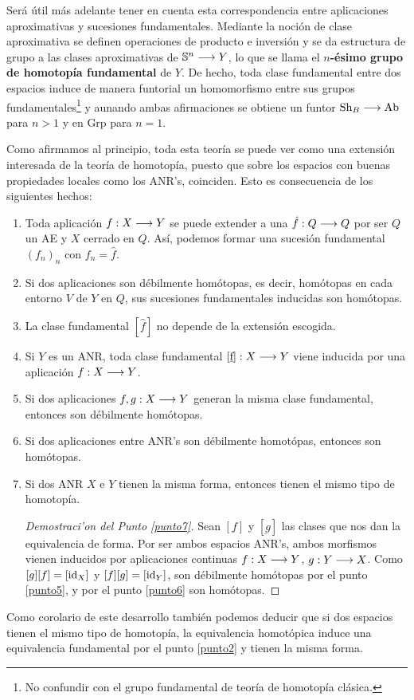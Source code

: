Será útil más adelante tener en cuenta esta correspondencia entre aplicaciones aproximativas y sucesiones fundamentales. Mediante la noción de clase aproximativa se definen operaciones de producto e inversión y se da estructura de grupo a las clases aproximativas de $ \mathbb{S}^n\longrightarrow Y  $, lo que se llama el $ n $\textbf{-ésimo grupo de homotopía fundamental} de $ Y  $. De hecho, toda clase fundamental entre dos espacios induce de manera funtorial un homomorfismo entre sus grupos fundamentales\footnote{No confundir con el grupo fundamental de teoría de homotopía clásica.} y aunando ambas afirmaciones se obtiene un funtor $ \operatorname{Sh}_B \longrightarrow \text{Ab} $ para $ n>1  $ y en Grp para $ n=1 $.

Como afirmamos al principio, toda esta teoría se puede ver como una extensión interesada de la teoría de homotopía, puesto que sobre los espacios con buenas propiedades locales como los ANR's, coinciden. Esto es consecuencia de los siguientes hechos:
\begin{enumerate}
  \item Toda aplicación $ f:X\longrightarrow Y  $ se puede extender a una $ \hat{f}:Q\longrightarrow Q  $ por ser $ Q  $ un AE y $ X  $ cerrado en $ Q  $. Así, podemos formar una sucesión fundamental $ (f_n )_n  $ con $ f_n =  \hat{f} $.
  \item  \label{punto2} Si dos aplicaciones son débilmente homótopas, es decir, homótopas en cada entorno $ V  $ de $ Y  $ en $ Q  $, sus sucesiones fundamentales inducidas son homótopas. 
  \item La clase fundamental $ [\hat{f}] $ no depende de la extensión escogida.
  \item Si $ Y  $ es un ANR, toda clase fundamental $ [\underbar{f}]:X\longrightarrow Y  $ viene inducida por una aplicación $ f:X\longrightarrow Y  $.
  \item Si dos aplicaciones $ f,g:X\longrightarrow Y  $ generan la misma clase fundamental, entonces son débilmente homótopas.\label{punto5}
  \item Si dos aplicaciones entre ANR's son débilmente homotópas, entonces son homótopas. \label{punto6}
  \item Si dos ANR $ X  $ e $ Y  $ tienen la misma forma, entonces tienen el mismo tipo de homotopía. \label{punto7}
  \begin{proof}[Demostraci'on del Punto \ref{punto7}]
    Sean $ [\underbar{f}] $ y $ [\underbar{g}] $ las clases que nos dan la equivalencia de forma. Por ser ambos espacios ANR's, ambos morfismos vienen inducidos por aplicaciones continuas $ f:X\longrightarrow Y  $, $ g:Y\longrightarrow X  $. Como $ [g][f] = [\operatorname{id}_X ] $ y $ [f][g] = [\operatorname{id}_Y] $, son débilmente homótopas por el punto \ref{punto5}, y por el punto \ref{punto6} son homótopas.
  \end{proof}
\end{enumerate}
Como corolario de este desarrollo también podemos deducir que si dos espacios tienen el mismo tipo de homotopía, la equivalencia homotópica induce una equivalencia fundamental por el punto \ref{punto2} y tienen la misma forma. 

